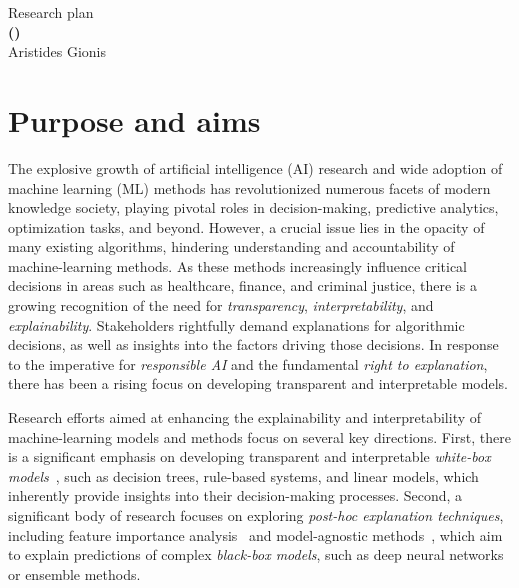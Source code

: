 \documentclass[a4paper,11pt]{article}
\begin{document}
\begin{center} 
{\Large Research plan} \vspace{3mm}\\
{\Large\bf {\proposaltitle} {\sc (}{\acronymtitle}{\sc )}}  \vspace{3mm} \\
{\Large Aristides Gionis} 
\end{center}


\section{Purpose and aims}


The explosive growth of artificial intelligence (AI) research and wide adoption of machine learning (ML) methods 
has revolutionized numerous facets of modern knowledge society, 
playing pivotal roles in decision-making, predictive analytics, optimization tasks, and beyond. 
However, a crucial issue lies in the opacity of many existing algorithms, 
hindering understanding and accountability of machine-learning methods. 
As these methods increasingly influence critical decisions in areas such as 
healthcare, finance, and criminal justice, 
there is a growing recognition of the need for \emph{transparency}, 
\emph{interpretability}, and \emph{explainability}.
Stakeholders rightfully demand explanations for algorithmic decisions, 
as well as insights into the factors driving those decisions. 
In response to the imperative for \emph{responsible AI} and the fundamental \emph{right to explanation}, 
there has been a rising focus on developing transparent and interpretable models.

Research efforts aimed at enhancing the explainability and interpretability 
of machine-learning models and methods focus on several key directions. 
First, there is a significant emphasis on developing transparent and interpretable 
\emph{white-box models}~\cite{loyola2019black}, 
such as decision trees, rule-based systems, and linear models, 
which inherently provide insights into their decision-making processes. 
Second, a significant body of research focuses on exploring \emph{post-hoc explanation techniques}, 
including feature importance analysis~\cite{lundberg2017unified} and 
model-agnostic methods~\cite{ribeiro2016model}, 
which aim to explain predictions of complex \emph{black-box models}, 
such as deep neural networks or ensemble methods.
\end{document}
